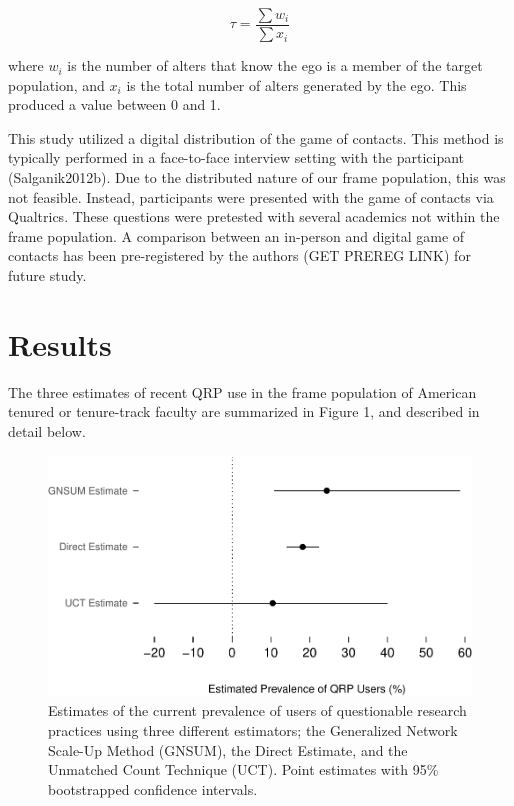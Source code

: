 \documentclass[,jou]{apa6}
\theoremstyle{definition}
\theoremstyle{definition}
\theoremstyle{definition}
\theoremstyle{remark}
\begin{document}
\begin{equation}
\tau = \frac{\sum{w_i}}{\sum{x_i}}
\end{equation}

where \(w_i\) is the number of alters that know the ego is a member of
the target population, and \(x_i\) is the total number of alters
generated by the ego. This produced a value between 0 and 1.

This study utilized a digital distribution of the game of contacts. This
method is typically performed in a face-to-face interview setting with
the participant (Salganik2012b). Due to the distributed nature of our
frame population, this was not feasible. Instead, participants were
presented with the game of contacts via Qualtrics. These questions were
pretested with several academics not within the frame population. A
comparison between an in-person and digital game of contacts has been
pre-registered by the authors (GET PREREG LINK) for future study.

\section{Results}\label{results}

The three estimates of recent QRP use in the frame population of
American tenured or tenure-track faculty are summarized in Figure 1, and
described in detail below.

\begin{figure}
\centering
\includegraphics{papaja_output_files/figure-latex/unnamed-chunk-12-1.pdf}
\caption{\label{fig:unnamed-chunk-12}\label{fig:fig1}Estimates of the
current prevalence of users of questionable research practices using
three different estimators; the Generalized Network Scale-Up Method
(GNSUM), the Direct Estimate, and the Unmatched Count Technique (UCT).
Point estimates with 95\% bootstrapped confidence intervals.}
\end{figure}
\end{document}

